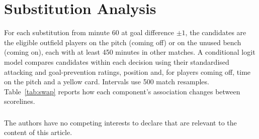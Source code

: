 \documentclass[runningheads]{llncs}
\begin{document}
\section{Substitution Analysis}
\label{app:designs}
For each substitution from minute 60 at goal difference $\pm1$, the candidates are the eligible outfield players on the pitch (coming off) or on the unused bench (coming on), each with at least 450 minutes in other matches. A conditional logit model compares candidates within each decision using their standardised attacking and goal-prevention ratings, position and, for players coming off, time on the pitch and a yellow card. Intervals use 500 match resamples. Table~\ref{tab:swap} reports how each component's association changes between scorelines.

\FloatBarrier
\begin{credits}
\subsubsection{\discintname}
The authors have no competing interests to declare that are relevant to the content of this article.
\end{credits}
\end{document}
